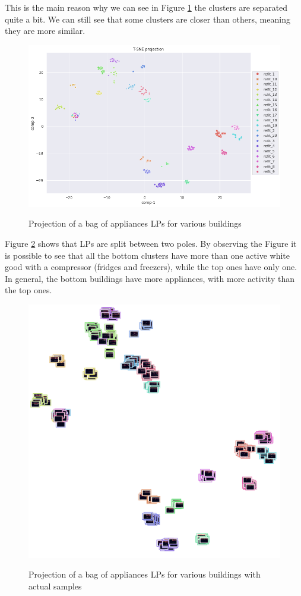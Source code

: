 This is the main reason why we can see in Figure \ref{fig:tsne_boa_scatter_refit8} the clusters are separated quite a bit.
We can still see that some clusters are closer than others,
meaning they are more similar.

\begin{figure}[H]
	\centering
	\caption{Projection of a bag of appliances LPs for various buildings}
	\includegraphics[width=.8\textwidth]{Figures/TSNE/TSNE_BOA/refit/scatter_refit_all.png}
	\label{fig:tsne_boa_scatter_refit8}
\end{figure}

Figure \ref{fig:tsne_boa_img_scatter_refit8} shows that LPs are split 
between two poles. 
By observing the Figure it is possible to see that all the bottom clusters
have more than one active white good with a compressor (fridges and freezers), while
the top ones have only one. In general, the bottom buildings have more appliances,
with more activity than the top ones. 

\begin{figure}[H]
	\centering
	\caption{Projection of a bag of appliances LPs for various buildings with actual samples}
	\includegraphics[width=.9\textwidth]{Figures/TSNE/TSNE_BOA/refit/img_scatter_refitall.png}
	\label{fig:tsne_boa_img_scatter_refit8}
\end{figure}

